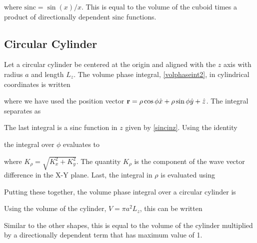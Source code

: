 \noindent where $\textrm{sinc} = \sin(x)/x$. This is equal to the volume of the cuboid times a product of directionally dependent $\textrm{sinc}$ functions.


\subsection{Circular Cylinder}

Let a circular cylinder be centered at the origin and aligned with the $z$ axis with radius $a$ and length $L_z$. The volume phase integral, \eqref{volphaseint2}, in cylindrical coordinates is written 

\noindent where we have used the position vector $\mathbf{r} = \rho \cos\phi \hat{x} + \rho \sin\phi \hat{y} + \hat{z}$. The integral separates as 

The last integral is a sinc function in $z$ given by \eqref{sincinz}. Using the identity 

\noindent the integral over $\phi$ evaluates to 

\noindent where $K_{\rho} = \sqrt{K_x^2 + K_y^2}$. The quantity $K_{\rho}$ is the component of the wave vector difference in the X-Y plane. Last, the integral in $\rho$ is evaluated using

Putting these together, the volume phase integral over a circular cylinder is

Using the volume of the cylinder, $V = \pi a^2 L_z$, this can be written 

Similar to the other shapes, this is equal to the volume of the cylinder multiplied by a directionally dependent term that has maximum value of 1.  


